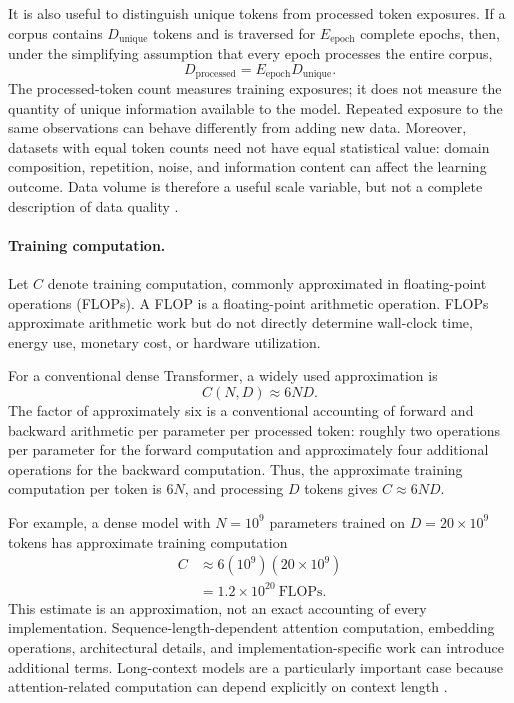 It is also useful to distinguish unique tokens from processed token
exposures. If a corpus contains \(D_{\mathrm{unique}}\) tokens and is traversed
for \(E_{\mathrm{epoch}}\) complete epochs, then, under the simplifying
assumption that every epoch processes the entire corpus,
\begin{equation}
    D_{\mathrm{processed}}
    =
    E_{\mathrm{epoch}}D_{\mathrm{unique}}.
    \label{eq:scaling-repeated-data}
\end{equation}
The processed-token count measures training exposures; it does not measure
the quantity of unique information available to the model. Repeated exposure
to the same observations can behave differently from adding new data.
Moreover, datasets with equal token counts need not have equal statistical
value: domain composition, repetition, noise, and information content can
affect the learning outcome. Data volume is therefore a useful scale variable,
but not a complete description of data quality
\parencite{Sengupta2025ScalingSurvey,Li2025MisFitting}.

\paragraph{Training computation.}
Let \(C\) denote training computation, commonly approximated in floating-point
operations (FLOPs). A FLOP is a floating-point arithmetic operation. FLOPs
approximate arithmetic work but do not directly determine wall-clock time,
energy use, monetary cost, or hardware utilization.

For a conventional dense Transformer, a widely used approximation is
\begin{equation}
    C(N,D)\approx 6ND.
    \label{eq:scaling-six-nd}
\end{equation}
The factor of approximately six is a conventional accounting of forward and
backward arithmetic per parameter per processed token: roughly two operations
per parameter for the forward computation and approximately four additional
operations for the backward computation. Thus, the approximate training
computation per token is \(6N\), and processing \(D\) tokens gives
\(C\approx 6ND\).

For example, a dense model with \(N=10^9\) parameters trained on
\(D=20\times10^9\) tokens has approximate training computation
\begin{align}
    C
    &\approx 6(10^9)(20\times10^9) \nonumber\\
    &=1.2\times10^{20}\ \text{FLOPs}.
    \label{eq:scaling-flops-example}
\end{align}
This estimate is an approximation, not an exact accounting of every
implementation. Sequence-length-dependent attention computation, embedding
operations, architectural details, and implementation-specific work can
introduce additional terms. Long-context models are a particularly important
case because attention-related computation can depend explicitly on context
length \parencite{Li2025MisFitting}.

